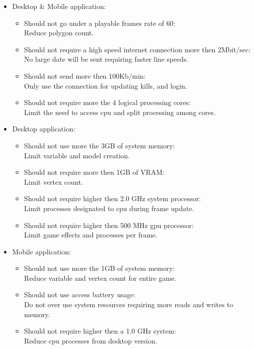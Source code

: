 \documentclass[letterpaper]{article}
\begin{document}
					\begin{itemize}
						\item Desktop \& Mobile application:
							\begin{itemize}
								\item Should not go under a playable frames rate of 60: \\
										Reduce polygon count.
								\item Should not require a high speed internet connection more then 2Mbit/sec: \\
										No large date will be sent requiring faster line speeds.
								\item Should not send more then 100Kb/min: \\
										Only use the connection for updating kills, and login.
								\item Should not require more the 4 logical processing cores: \\
										Limit the need to access cpu and split processing among cores.
							\end{itemize}
							
						\item Desktop application:
							\begin{itemize}
								\item Should not use more the 3GB of system memory: \\
										Limit variable and model creation.
								\item Should not require more then 1GB of VRAM: \\
										Limit vertex count.
								\item Should not require higher then 2.0 GHz system processor: \\
										Limit processes designated to cpu during frame update.
								\item Should not require higher then 500 MHz gpu processor: \\
										Limit game effects and processes per frame.
							\end{itemize}
							
						\item Mobile application:
							\begin{itemize}
								\item Should not use more the 1GB of system memory: \\
										Reduce variable and vertex count for entire game.
								\item Should not use access battery usage: \\
										Do not over use system resources requiring more reads and writes to memory.
								\item Should not require higher then a 1.0 GHz system: \\
										Reduce cpu processes from desktop version.
							\end{itemize}
							

\end{itemize}
\end{document}
